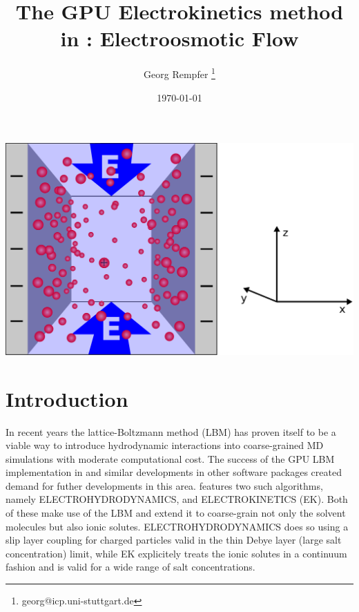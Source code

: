 \renewcommand{\d}{\mathrm d}
\subject{ESPResSo Tutorial}
\title{The GPU Electrokinetics method in \ES{}: 
Electroosmotic Flow
} \author{ Georg Rempfer \thanks{\ttfamily 
georg@icp.uni-stuttgart.de}}
\date{\today}
\publishers{Institute for Computational Physics, University of Stuttgart}
\maketitle 
\begin{center}
  \includegraphics[width=0.7\columnwidth]{figures/schlitzpore_3d.pdf}
\end{center}
\pagebreak
{}

 \tableofcontents
 \pagebreak
  
\section{Introduction}


In recent years the lattice-Boltzmann method (LBM) has proven itself to be a viable way to introduce hydrodynamic interactions into coarse-grained MD simulations with moderate computational cost. The success of the GPU LBM implementation in \ES{} and similar developments in other software packages created demand for futher developments in this area. \ES{} features two such algorithms, namely ELECTROHYDRODYNAMICS, and ELECTROKINETICS (EK). Both of these make use of the LBM and extend it to coarse-grain not only the solvent molecules but also ionic solutes. ELECTROHYDRODYNAMICS does so using a slip layer coupling for charged particles valid in the thin Debye layer (large salt concentration) limit, while EK explicitely treats the ionic solutes in a continuum fashion and is valid for a wide range of salt concentrations.


